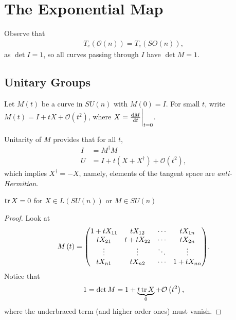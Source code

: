 
\section{The Exponential Map}



Observe that
\begin{align}
    T_e \left( \mathcal{O}\left( n \right)  \right) = T_e \left( SO \left( n \right)  \right) 
,\end{align}
as $\det I = 1$, so all curves passing through $I$ have $\det M = 1$.

\subsection{Unitary Groups}



Let $M\left( t \right) $ be a curve in $SU \left( n \right) $ with $ M \left( 0 \right) = I$. For small $t$, write $M \left( t \right) = I + t X + \mathcal{O}\left( t^2 \right) $, where $X = \dv{M}{t} \bigg|_{t=0}$. 

Unitarity of $M$ provides that for all $t$,
\begin{align}
    I &= M^{\dag} M \\
    U &= I + t \left( X + X^{\dag} \right) + \mathcal{O}\left( t^2 \right) 
,\end{align}
which implies $X^{\dag} = -X$, namely, elements of the tangent space are \textit{anti-Hermitian}.

\begin{claim}
    $\tr X = 0$ for $X \in L \left( SU \left( n \right)  \right)$ or $M \in SU \left( n \right) $
\end{claim}

\begin{proof}
    Look at
    \begin{align}
        M\left( t \right) = \mqty( 1 + t X_{11} & t X_{12} & \cdots & t X_{1n} \\
        t X_{21} & t + t X_{22} & \cdots & tX_{2n} \\
        \vdots & \vdots & \ddots & \vdots \\
        t X_{n1} & t X_{n2} & \cdots & 1 + t X_{n n} )
    .\end{align}
    Notice that
    \begin{align}
        1 = \det M = 1 + \underbrace{t \tr X}_{0} + \mathcal{O} \left( t^2 \right) 
    ,\end{align}
    where the underbraced term (and higher order ones) must vanish.
\end{proof}

